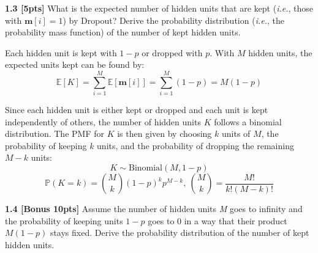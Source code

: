 \documentclass{article}
\begin{document}
\noindent
\textbf{1.3 [5pts]} What is the expected number of hidden units that are kept (\textit{i.e.}, those with $\textbf{m}[i] = 1$) by Dropout? Derive the probability distribution (\textit{i.e.}, the probability mass function) of the number of kept hidden units.\\

{\color{blue}
Each hidden unit is kept with $1-p$ or dropped with $p$. With $M$ hidden units, the expected units kept can be found by:
\begin{equation}
    \mathbb{E}[K]=\sum_{i=1}^{M} \mathbb{E}[\textbf{m}[i]]= \sum_{i=1}^{M}(1-p)=M(1-p)
\end{equation}

Since each hidden unit is either kept or dropped and each unit is kept independently of others, the number of hidden units $K$ follows a binomial distribution. The PMF for $K$ is then given by choosing $k$ units of $M$, the probability of keeping $k$ units, and the probability of dropping the remaining $M-k$ units:
\begin{equation}
    K \sim \text{Binomial}(M,1-p)
\end{equation}
\begin{equation}
    \mathbb{P}(K=k)= \binom{M}{k}(1-p)^kp^{M-k}, \ \binom{M}{k}=\frac{M!}{k!(M-k)!}
\end{equation}
}

\noindent
\textbf{1.4 [Bonus 10pts]} Assume the number of hidden units \textit{M} goes to infinity and the probability of keeping units $1-p$ goes to 0 in a way that their product $M (1-p)$ stays fixed. Derive the probability distribution of the number of kept hidden units.\\
\end{document}
